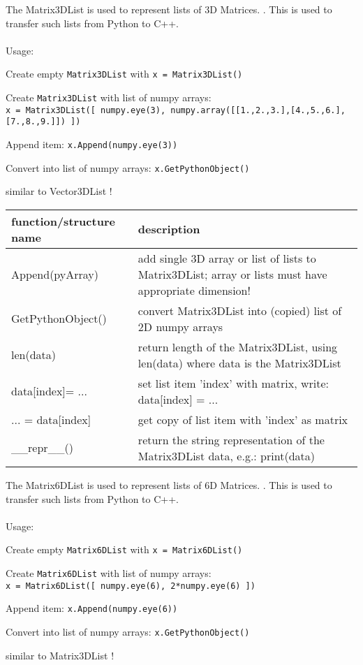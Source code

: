 The Matrix3DList is used to represent lists of 3D Matrices. . This is used to transfer such lists from Python to C++. \\ \\ Usage: \bi
  \item Create empty \texttt{Matrix3DList} with \texttt{x = Matrix3DList()} 
  \item Create \texttt{Matrix3DList} with list of numpy arrays:\\\texttt{x = Matrix3DList([ numpy.eye(3), numpy.array([[1.,2.,3.],[4.,5.,6.],[7.,8.,9.]]) ])}
  \item Append item: \texttt{x.Append(numpy.eye(3))}
  \item Convert into list of numpy arrays: \texttt{x.GetPythonObject()}
  \item similar to Vector3DList !
\ei


\begin{center}
\footnotesize
\begin{longtable}{| p{8cm} | p{8cm} |} 
\hline
{\bf function/structure name} & {\bf description}\\ \hline
  Append(pyArray) & add single 3D array or list of lists to Matrix3DList; array or lists must have appropriate dimension!\\ \hline 
  GetPythonObject() & convert Matrix3DList into (copied) list of 2D numpy arrays\\ \hline 
  len(data) & return length of the Matrix3DList, using len(data) where data is the Matrix3DList\\ \hline 
  data[index]= ... & set list item 'index' with matrix, write: data[index] = ...\\ \hline 
  ... = data[index] & get copy of list item with 'index' as matrix\\ \hline 
  \_\_repr\_\_() & return the string representation of the Matrix3DList data, e.g.: print(data)\\ \hline 
\end{longtable}
\end{center}

The Matrix6DList is used to represent lists of 6D Matrices. . This is used to transfer such lists from Python to C++. \\ \\ Usage: \bi
  \item Create empty \texttt{Matrix6DList} with \texttt{x = Matrix6DList()} 
  \item Create \texttt{Matrix6DList} with list of numpy arrays:\\\texttt{x = Matrix6DList([ numpy.eye(6), 2*numpy.eye(6) ])}
  \item Append item: \texttt{x.Append(numpy.eye(6))}
  \item Convert into list of numpy arrays: \texttt{x.GetPythonObject()}
  \item similar to Matrix3DList !
\ei


